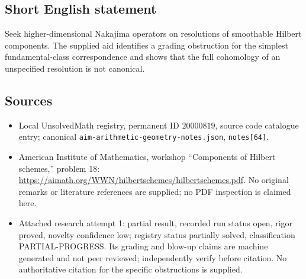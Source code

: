 \documentclass[11pt]{article}
\begin{document}
\subsection{Short English statement}
Seek higher-dimensional Nakajima operators on resolutions of smoothable Hilbert components. The supplied aid identifies a grading obstruction for the simplest fundamental-class correspondence and shows that the full cohomology of an unspecified resolution is not canonical.
\subsection{Sources}
\begin{itemize}
\item Local UnsolvedMath registry, permanent ID $20000819$, source code catalogue entry; canonical \texttt{aim-arithmetic-geometry-notes.json}, \texttt{notes[64]}.
\item American Institute of Mathematics, workshop ``Components of Hilbert schemes,'' problem 18: \url{https://aimath.org/WWN/hilbertschemes/hilbertschemes.pdf}. No original remarks or literature references are supplied; no PDF inspection is claimed here.
\item Attached research attempt 1: partial result, recorded run status open, rigor proved, novelty confidence low; registry status partially solved, classification PARTIAL-PROGRESS. Its grading and blow-up claims are machine generated and not peer reviewed; independently verify before citation. No authoritative citation for the specific obstructions is supplied.
\end{itemize}
\end{document}
